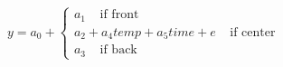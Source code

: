 

\[
y = a_0 + \left\{ \begin{array}{l} a_1 \;\;\;\; \mbox{if front} \\ a_2 + a_{4}temp + a_{5}time + e \;\;\;\; \mbox{if center} \\ a_3 \;\;\;\; \mbox{if back} \end{array} \right.
\]



